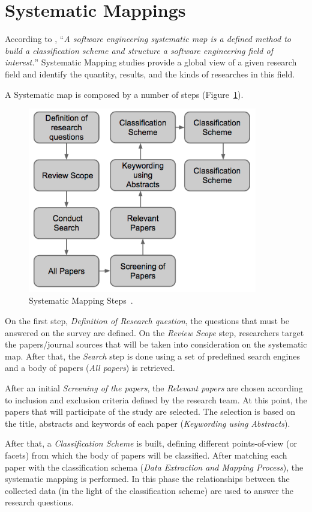 \section{Systematic Mappings}
According to \cite{Petersen:2008:SMS:2227115.2227123}, ``\textit{A software engineering systematic map is a defined method to build a classification scheme and structure a software engineering field of interest.}''
Systematic Mapping studies provide a global view of a given research field and identify the quantity, results, and the kinds of researches in this field.

A Systematic map is composed by a number of steps (Figure~\ref{fig:sms}).
\begin{figure}[ht!]
\centering
\includegraphics[width=100mm]{Imagens/pic1.png}
\caption{Systematic Mapping Steps~\cite{Petersen:2008:SMS:2227115.2227123}.\label{fig:sms}}
\end{figure}

On the first step, \textit{Definition of Research question}, the questions that must be answered on the survey are defined. 
On the \textit{Review Scope} step, researchers target the papers/journal sources that will be taken into consideration on the systematic map. 
After that, the \textit{Search} step is done using a set of predefined search engines and a body of papers (\textit{All papers}) is retrieved. 

After an initial \textit{Screening of the papers}, the \textit{Relevant papers} are chosen according to inclusion and exclusion criteria defined by the research team. 
At this point, the papers that will participate of the study are selected. 
The selection is based on the title, abstracts and keywords of each paper (\textit{Keywording using Abstracts}).

After that, a \textit{Classification Scheme} is built, defining different points-of-view (or facets) from which the body of papers will be classified. 
After matching each paper with the classification schema (\textit{Data Extraction and Mapping Process}), the  systematic mapping is performed.
In this phase the relationships between the collected data (in the light of the classification scheme) are used to answer the research questions.




